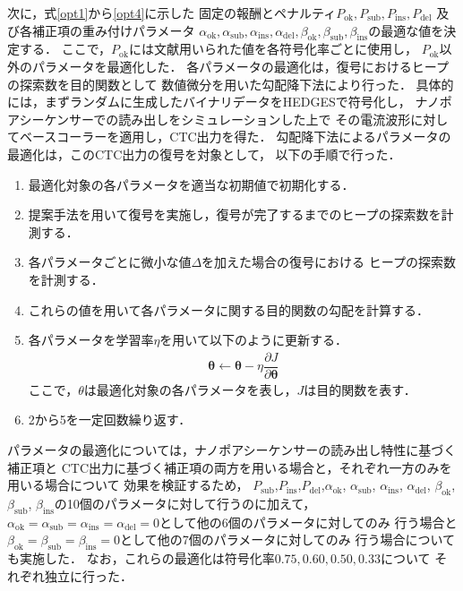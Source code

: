 \documentclass[sotsuron]{kuee}
\begin{document}
次に，式\eqref{opt1}から\eqref{opt4}に示した
固定の報酬とペナルティ$P_{\mathrm{ok}}, P_{\mathrm{sub}}, P_{\mathrm{ins}}, P_{\mathrm{del}}$
及び各補正項の重み付けパラメータ
$\alpha_{\mathrm{ok}}, \alpha_{\mathrm{sub}}, \alpha_{\mathrm{ins}}, \alpha_{\mathrm{del}},
\beta_{\mathrm{ok}}, \beta_{\mathrm{sub}}, \beta_{\mathrm{ins}}$の最適な値を決定する．
ここで，$P_{\mathrm{ok}}$には文献\cite{HEDGES}用いられた値を各符号化率ごとに使用し，
$P_{\mathrm{ok}}$以外のパラメータを最適化した．
各パラメータの最適化は，復号におけるヒープの探索数を目的関数として
数値微分を用いた勾配降下法により行った．
具体的には，まずランダムに生成したバイナリデータをHEDGESで符号化し，
ナノポアシーケンサーでの読み出しをシミュレーションした上で
その電流波形に対してベースコーラーを適用し，CTC出力を得た．
勾配降下法によるパラメータの最適化は，このCTC出力の復号を対象として，
以下の手順で行った．
\begin{enumerate}
  \item 最適化対象の各パラメータを適当な初期値で初期化する．
  \item 提案手法を用いて復号を実施し，復号が完了するまでのヒープの探索数を計測する．
  \item 各パラメータごとに微小な値$\Delta$を加えた場合の復号における
  ヒープの探索数を計測する．
  \item これらの値を用いて各パラメータに関する目的関数の勾配を計算する．
  \item 各パラメータを学習率$\eta$を用いて以下のように更新する．
  \begin{align}
    \bm{\theta} \leftarrow \bm{\theta} - \eta \dfrac{\partial J}{\partial \bm{\theta}}
  \end{align}
  ここで，$\theta$は最適化対象の各パラメータを表し，$J$は目的関数を表す．
  \item 2から5を一定回数繰り返す．
\end{enumerate}
パラメータの最適化については，ナノポアシーケンサーの読み出し特性に基づく補正項と
CTC出力に基づく補正項の両方を用いる場合と，それぞれ一方のみを用いる場合について
効果を検証するため，
$P_{\mathrm{sub}}$,$P_{\mathrm{ins}}$,$P_{\mathrm{del}}$,$\alpha_{\mathrm{ok}}$, $\alpha_{\mathrm{sub}}$, $\alpha_{\mathrm{ins}}$, $\alpha_{\mathrm{del}}$,
$\beta_{\mathrm{ok}}$, $\beta_{\mathrm{sub}}$, $\beta_{\mathrm{ins}}$の10個のパラメータに対して行うのに加えて，
$\alpha_{\mathrm{ok}}=\alpha_{\mathrm{sub}}=\alpha_{\mathrm{ins}}=\alpha_{\mathrm{del}}=0$として他の6個のパラメータに対してのみ
行う場合と
$\beta_{\mathrm{ok}}=\beta_{\mathrm{sub}}=\beta_{\mathrm{ins}}=0$として他の7個のパラメータに対してのみ
行う場合についても実施した．
なお，これらの最適化は符号化率$0.75,0.60,0.50,0.33$について
それぞれ独立に行った．
\end{document}
